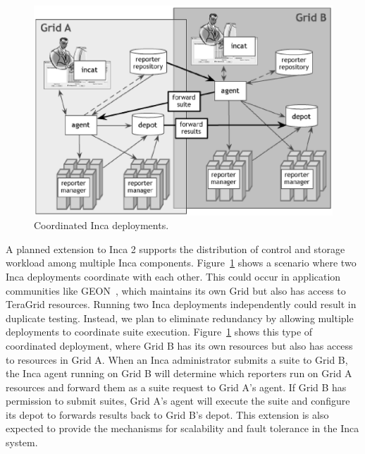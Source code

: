 \documentclass[times,10pt,twocolumn]{article}
\begin{document}
\begin{figure}[tbp]
  \centering
  \includegraphics[width=.6\textwidth]{vo.eps}
  \caption{\label{tg_coord_fig} Coordinated Inca deployments.}
\end{figure}

A planned extension to Inca 2 supports the distribution of control and storage
workload among multiple Inca components.  Figure~\ref{tg_coord_fig} shows a
scenario where two Inca deployments coordinate with each other.  This could
occur in application communities like GEON~\cite{geon}, which maintains its
own Grid but also has access to TeraGrid resources.   Running two Inca
deployments independently could result in duplicate testing.  Instead, we plan
to eliminate redundancy by allowing multiple deployments to coordinate suite
execution.
Figure~\ref{tg_coord_fig} shows this type of coordinated deployment, where Grid B 
has its own resources but also has access to resources in Grid A.
When an Inca administrator submits a suite to Grid B, the Inca agent running
on Grid B will determine which reporters run on Grid A resources and forward
them as a suite request to Grid A's agent.  If Grid B has permission to submit
suites, Grid A's agent will execute the suite and configure its depot to
forwards results back to Grid B's depot.  This extension is also expected
to provide the mechanisms for scalability and fault tolerance in the Inca
system.


\label{usecases}


\end{document}
